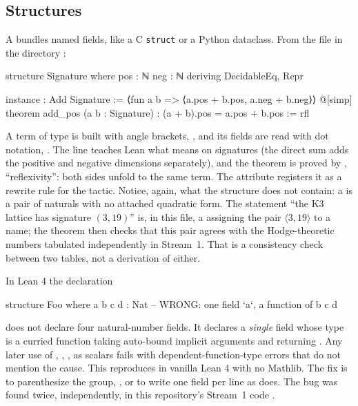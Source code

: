 \subsection{Structures}
A  bundles named fields, like a C \texttt{struct} or a Python dataclass.
From the file  in the directory
:
\begin{leancode}
structure Signature where
  pos : ℕ
  neg : ℕ
  deriving DecidableEq, Repr

instance : Add Signature := ⟨fun a b => ⟨a.pos + b.pos, a.neg + b.neg⟩⟩
@[simp] theorem add_pos (a b : Signature) : (a + b).pos = a.pos + b.pos := rfl
\end{leancode}
A term of type  is built with angle brackets, , and its
fields are read with dot notation, . The  line teaches Lean what
\lean{+} means on signatures (the direct sum adds the positive and negative dimensions
separately), and the theorem  is proved by , ``reflexivity'':
both sides unfold to the same term. The attribute  registers it as a rewrite
rule for the  tactic. Notice, again, what the structure does not contain: a
 is a pair of naturals with no attached quadratic form. The statement
``the K3 lattice has signature $(3,19)$'' is, in this file, a  assigning the pair
$\langle 3,19\rangle$ to a name; the theorem  then checks that
this pair agrees with the Hodge-theoretic numbers tabulated independently in Stream~1. That
is a consistency check between two tables, not a derivation of either.

\begin{pitfallbox}
In Lean 4 the declaration
\begin{leancode}
structure Foo where
  a b c d : Nat        -- WRONG: one field `a`, a function of b c d
\end{leancode}
does not declare four natural-number fields. It declares a \emph{single} field 
whose type is a curried function taking auto-bound implicit arguments  and
returning . Any later use of , , ,  as scalars
fails with dependent-function-type errors that do not mention the cause. This reproduces
in vanilla Lean 4 with no Mathlib. The fix is to parenthesize the group,
, or to write one field per line as  does. The bug
was found twice, independently, in this repository's Stream~1 code
.
\end{pitfallbox}

